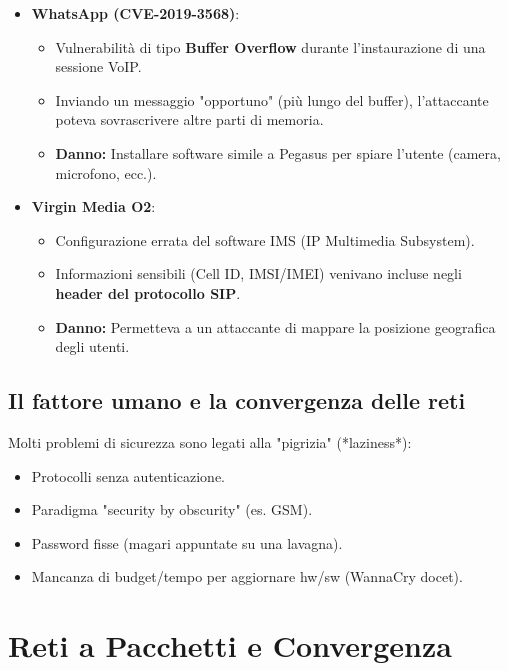 \documentclass[a4paper,12pt]{article}
\begin{document}
\begin{itemize}
    \item \textbf{WhatsApp (CVE-2019-3568)}:
          \begin{itemize}
              \item Vulnerabilità di tipo \textbf{Buffer Overflow} durante l'instaurazione di una sessione VoIP.
              \item Inviando un messaggio "opportuno" (più lungo del buffer), l'attaccante poteva sovrascrivere altre parti di memoria.
              \item \textbf{Danno:} Installare software simile a Pegasus per spiare l'utente (camera, microfono, ecc.).
          \end{itemize}

    \item \textbf{Virgin Media O2}:
          \begin{itemize}
              \item Configurazione errata del software IMS (IP Multimedia Subsystem).
              \item Informazioni sensibili (Cell ID, IMSI/IMEI) venivano incluse negli \textbf{header del protocollo SIP}.
              \item \textbf{Danno:} Permetteva a un attaccante di mappare la posizione geografica degli utenti.
          \end{itemize}
\end{itemize}

\subsection{Il fattore umano e la convergenza delle reti}
Molti problemi di sicurezza sono legati alla "pigrizia" (*laziness*):
\begin{itemize}
    \item Protocolli senza autenticazione.
    \item Paradigma "security by obscurity" (es. GSM).
    \item Password fisse (magari appuntate su una lavagna).
    \item Mancanza di budget/tempo per aggiornare hw/sw (WannaCry docet).
\end{itemize}

\section{Reti a Pacchetti e Convergenza}
\end{document}
